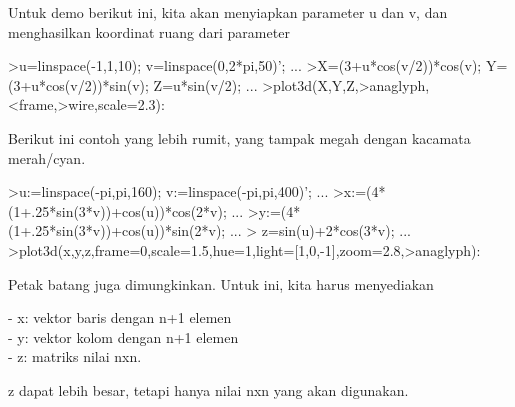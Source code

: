 \documentclass{article}
\begin{document}
\begin{eulernotebook}
\begin{eulercomment}
\begin{eulercomment}
\begin{eulercomment}
Untuk demo berikut ini, kita akan menyiapkan parameter u dan v, dan
menghasilkan koordinat ruang dari parameter 
\end{eulercomment}
\begin{eulerprompt}
>u=linspace(-1,1,10); v=linspace(0,2*pi,50)'; ...
>X=(3+u*cos(v/2))*cos(v); Y=(3+u*cos(v/2))*sin(v); Z=u*sin(v/2); ...
>plot3d(X,Y,Z,>anaglyph,<frame,>wire,scale=2.3):
\end{eulerprompt}
\begin{eulercomment}
Berikut ini contoh yang lebih rumit, yang tampak megah dengan kacamata
merah/cyan.
\end{eulercomment}
\begin{eulerprompt}
>u:=linspace(-pi,pi,160); v:=linspace(-pi,pi,400)';  ...
>x:=(4*(1+.25*sin(3*v))+cos(u))*cos(2*v); ...
>y:=(4*(1+.25*sin(3*v))+cos(u))*sin(2*v); ...
> z=sin(u)+2*cos(3*v); ...
>plot3d(x,y,z,frame=0,scale=1.5,hue=1,light=[1,0,-1],zoom=2.8,>anaglyph):
\end{eulerprompt}
\begin{eulercomment}
Petak batang juga dimungkinkan. Untuk ini, kita harus menyediakan

-   x: vektor baris dengan n+1 elemen\\
-   y: vektor kolom dengan n+1 elemen\\
-   z: matriks nilai nxn.

z dapat lebih besar, tetapi hanya nilai nxn yang akan digunakan.


\end{eulercomment}
\end{eulercomment}
\end{eulercomment}
\end{eulernotebook}
\end{document}
